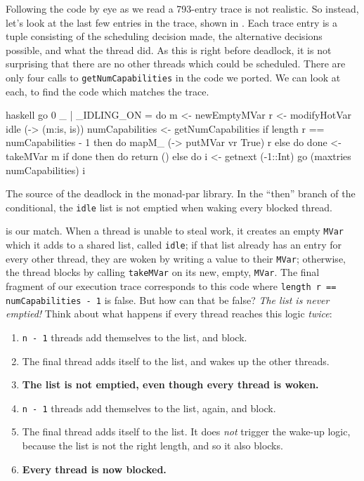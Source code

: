 Following the code by eye as we read a 793-entry trace is not
realistic.  So instead, let's look at the last few entries in the
trace, shown in .  Each trace entry is a
tuple consisting of the scheduling decision made, the alternative
decisions possible, and what the thread did.  As this is right before
deadlock, it is not surprising that there are no other threads which
could be scheduled.  There are only four calls to
\verb|getNumCapabilities| in the code we ported.  We can look at each,
to find the code which matches the trace.

\begin{listing}
\centering
\begin{cminted}{haskell}
go 0 _ | _IDLING_ON =
  do m <- newEmptyMVar
     r <- modifyHotVar idle (\is -> (m:is, is))
     numCapabilities <- getNumCapabilities
     if length r == numCapabilities - 1
       then do
         mapM_ (\vr -> putMVar vr True) r
       else do
         done <- takeMVar m
         if done
           then do
             return ()
           else do
             i <- getnext (-1::Int)
             go (maxtries numCapabilities) i
\end{cminted}
\caption[The source of the deadlock in the monad-par library.]{The source of the deadlock in the monad-par library.  In the ``then'' branch of the conditional, the \texttt{idle} list is not emptied when waking every blocked thread.}\label{lst:parmonad_example4}
\end{listing}

 is our match.  When a thread is unable to
steal work, it creates an empty \verb|MVar| which it adds to a shared
list, called \verb|idle|; if that list already has an entry for every
other thread, they are woken by writing a value to their \verb|MVar|;
otherwise, the thread blocks by calling \verb|takeMVar| on its new,
empty, \verb|MVar|.  The final fragment of our execution trace
corresponds to this code where \verb|length r == numCapabilities - 1|
is false.  But how can that be false?  \emph{The list is never
  emptied!}  Think about what happens if every thread reaches this
logic \emph{twice}:

\begin{enumerate}
\item \verb|n - 1| threads add themselves to the list, and block.
\item The final thread adds itself to the list, and wakes up the other
  threads.
\item \textbf{The list is not emptied, even though every thread is woken.}
\item \verb|n - 1| threads add themselves to the list, again, and
  block.
\item The final thread adds itself to the list.  It does \emph{not}
  trigger the wake-up logic, because the list is not the right length,
  and so it also blocks.
\item \textbf{Every thread is now blocked.}
\end{enumerate}

